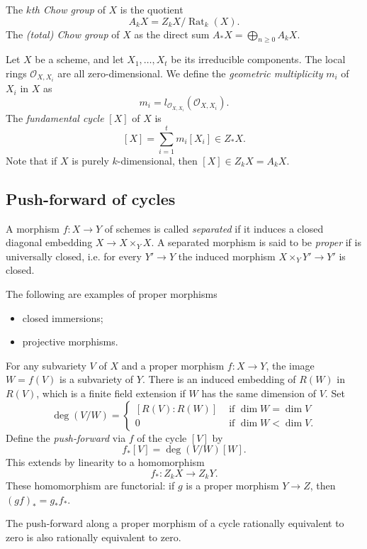 \documentclass[a4paper,openany]{scrbook}
\DeclareMathOperator{\Rat}{Rat}
\begin{document}
\begin{defn}
The \emph{$k$th Chow group} of $X$ is the quotient
\[
A_k X=Z_k X/\Rat_k(X).
\]
The \emph{(total) Chow group} of $X$ as the direct sum $A_*X=\bigoplus_{n\geq 0} A_kX$.
\end{defn}


Let $X$ be a scheme, and let $X_1,\ldots,X_t$ be its irreducible components. The local rings $\mathcal O_{X,X_i}$ are all zero-dimensional. We define the \emph{geometric multiplicity} $m_i$ of $X_i$ in $X$ as 
\[m_i=l_{\mathcal O_{X,X_i}}(\mathcal O_{X,X_i}).\]
The \emph{fundamental cycle} $[X]$ of $X$ is
\[[X]=\sum_{i=1}^t m_i[X_i] \in Z_*X.\]
Note that if $X$ is purely $k$-dimensional, then $[X]\in Z_kX=A_kX$.

\subsection{Push-forward of cycles}

A morphism $f\colon X\to Y$ of schemes is called \emph{separated} if it induces a closed diagonal embedding $X\to X\times_Y X$. A separated morphism is said to be \emph{proper} if is universally closed, i.e. for every $Y'\to Y$ the induced morphism $X\times_Y Y' \to Y'$ is closed.

\begin{example}
The following are examples of proper morphisms 
 \begin{itemize}
  \item closed immersions;
  \item projective morphisms.
 \end{itemize}
\end{example}

For any subvariety $V$ of $X$ and a proper morphism $f\colon X\to Y$, the image $W=f(V)$ is a subvariety of $Y$. There is an induced embedding of $R(W)$ in $R(V)$, which is a finite field extension if $W$ has the same dimension of $V$. Set
\[
\deg(V/W)=
\begin{cases}
[R(V):R(W)] &\text{ if } \dim W =\dim V\\
0  &\text{ if } \dim W <\dim V.
\end{cases}
\]
Define the \emph{push-forward} via $f$ of the cycle $[V]$ by
\[
f_*[V]=\deg(V/W)[W].
\]
This extends by linearity to a homomorphism
\[
f_*:Z_kX\to Z_kY.
\]
These homomorphism are functorial: if $g$ is a proper morphism $Y\to Z$, then $(gf)_*=g_*f_*$.
\begin{thm}
 The push-forward along a proper morphism of a cycle rationally equivalent to zero is also rationally equivalent to zero.
\end{thm}
\end{document}
